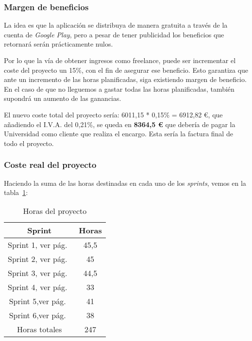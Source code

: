\subsubsection{Margen de beneficios}
La idea es que la aplicación se distribuya de manera gratuita a través de la cuenta de \emph{Google Play}, pero a pesar de tener publicidad los beneficios que retornará serán prácticamente nulos.

Por lo que la vía de obtener ingresos como freelance, puede ser incrementar el coste del proyecto un 15\%, con el fin de asegurar ese beneficio. Esto garantiza que ante un incremento de las horas planificadas, siga existiendo margen de beneficio. En el caso de que no lleguemos a gastar todas las horas planificadas, también supondrá un aumento de las ganancias.

El nuevo coste total del proyecto sería: 6011,15 * 0,15\% = 6912,82  €, que añadiendo el I.V.A. del 0,21\%, se queda en \textbf{8364,5 €} que debería de pagar la Universidad como cliente que realiza el encargo. Esta sería la factura final de todo el proyecto.

\subsubsection{Coste real del proyecto}
Haciendo la suma de las horas destinadas en cada uno de los \emph{sprints}, vemos en la tabla~\ref{table:horas}:

\begin{table}[H]
	\begin{center}
		\begin{tabular}{cc}
			\hline
			Sprint                        & Horas   	\\ \hline
			Sprint 1, ver pág.~\pageref{sprint-1-220620---260620}					    & 45,5     		\\
			Sprint 2, ver pág.~\pageref{sprint-1-270620---010720}					    & 45    		\\
			Sprint 3, ver pág.~\pageref{sprint-3-020720---070720}					    & 44,5  		\\
			Sprint 4, ver pág.~\pageref{sprint-4-070720---100720}					    & 33     		\\
			Sprint 5,ver pág.~\pageref{sprint-5-11072020---15072020}	& 41     			    		\\
			Sprint 6,ver pág.~\pageref{sprint-6-16072020---20072020}					    & 38    		\\  \hline
			Horas totales            	 		& 247			\\ \hline
		\end{tabular}
		\caption{Horas del proyecto}
		\label{table:horas}
	\end{center}
\end{table}


